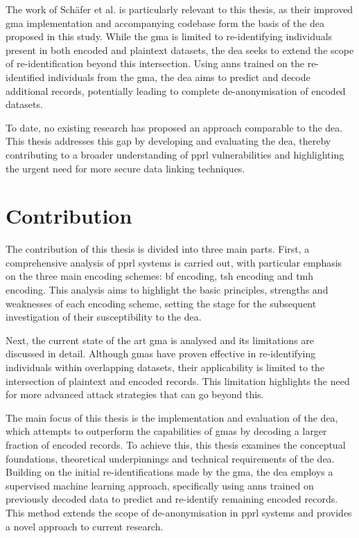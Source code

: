The work of Schäfer et al. \cite{schaefer2024} is particularly relevant to this thesis, as their improved \ac{gma} implementation and accompanying codebase form the basis of the \ac{dea} proposed in this study.
While the \ac{gma} is limited to re-identifying individuals present in both encoded and plaintext datasets, the \ac{dea} seeks to extend the scope of re-identification beyond this intersection.
Using \ac{ann}s trained on the re-identified individuals from the \ac{gma}, the \ac{dea} aims to predict and decode additional records, potentially leading to complete de-anonymisation of encoded datasets.

To date, no existing research has proposed an approach comparable to the \ac{dea}.
This thesis addresses this gap by developing and evaluating the \ac{dea}, thereby contributing to a broader understanding of \ac{pprl} vulnerabilities and highlighting the urgent need for more secure data linking techniques.

\section{Contribution}  \label{sec:contribution}

The contribution of this thesis is divided into three main parts.
First, a comprehensive analysis of \ac{pprl} systems is carried out, with particular emphasis on the three main encoding schemes: \ac{bf} encoding, \ac{tsh} encoding and \ac{tmh} encoding.
This analysis aims to highlight the basic principles, strengths and weaknesses of each encoding scheme, setting the stage for the subsequent investigation of their susceptibility to the \ac{dea}.

Next, the current state of the art \ac{gma} is analysed and its limitations are discussed in detail.
Although \ac{gma}s have proven effective in re-identifying individuals within overlapping datasets, their applicability is limited to the intersection of plaintext and encoded records.
This limitation highlights the need for more advanced attack strategies that can go beyond this.

The main focus of this thesis is the implementation and evaluation of the \ac{dea}, which attempts to outperform the capabilities of \ac{gma}s by decoding a larger fraction of encoded records.
To achieve this, this thesis examines the conceptual foundations, theoretical underpinnings and technical requirements of the \ac{dea}.
Building on the initial re-identifications made by the \ac{gma}, the \ac{dea} employs a supervised machine learning approach, specifically using \ac{ann}s trained on previously decoded data to predict and re-identify remaining encoded records.
This method extends the scope of de-anonymisation in \ac{pprl} systems and provides a novel approach to current research.


